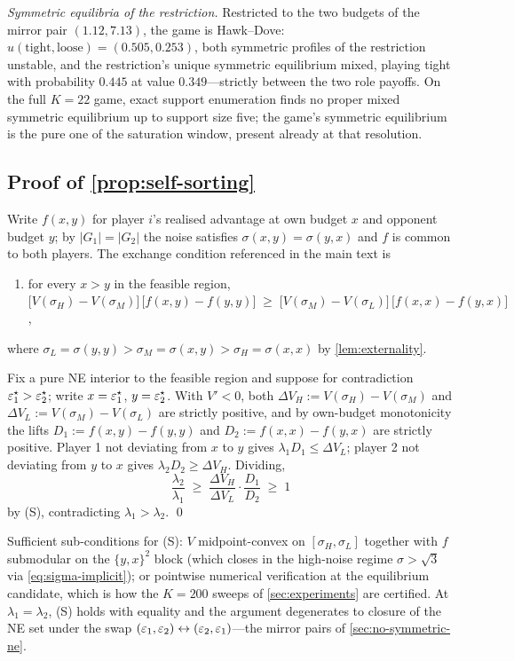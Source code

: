 \emph{Symmetric equilibria of the restriction.} Restricted to the
two budgets of the mirror pair $(1.12, 7.13)$, the game is
Hawk--Dove: $u(\textrm{tight}, \textrm{loose}) = (0.505, 0.253)$,
both symmetric profiles of the restriction unstable, and the
restriction's unique symmetric equilibrium mixed, playing tight
with probability $0.445$ at value $0.349$---strictly between the
two role payoffs. On the full $K = 22$ game, exact support
enumeration finds no proper mixed symmetric equilibrium up to
support size five; the game's symmetric equilibrium is the pure one
of the saturation window, present already at that resolution.

\subsection{Proof of \texorpdfstring{\cref{prop:self-sorting}}{the self-sorting proposition}}
\label{app:proof-self-sorting}

Write $f(x, y)$ for player $i$'s realised advantage at own budget $x$
and opponent budget $y$; by $|G_1| = |G_2|$
the noise satisfies $\sigma(x,y) = \sigma(y,x)$ and $f$ is common to
both players. The exchange condition referenced in the main text is
\begin{enumerate}
  \item[\textup{(S)}] for every $x > y$ in the feasible region,
        $\bigl[V(\sigma_H) - V(\sigma_M)\bigr]\,
         \bigl[f(x, y) - f(y, y)\bigr]
         \;\ge\;
         \bigl[V(\sigma_M) - V(\sigma_L)\bigr]\,
         \bigl[f(x, x) - f(y, x)\bigr]$,
\end{enumerate}
where $\sigma_L = \sigma(y,y) > \sigma_M = \sigma(x,y) > \sigma_H =
\sigma(x,x)$ by \cref{lem:externality}.

Fix a pure \ac{NE} interior to the feasible region and suppose for
contradiction $\varepsilon_1^\star > \varepsilon_2^\star$; write $x = \varepsilon_1^\star$,
$y = \varepsilon_2^\star$. With $V' < 0$, both $\Delta V_H := V(\sigma_H) -
V(\sigma_M)$ and $\Delta V_L := V(\sigma_M) - V(\sigma_L)$ are
strictly positive, and by own-budget monotonicity the lifts $D_1 :=
f(x,y) - f(y,y)$ and $D_2 := f(x,x) - f(y,x)$ are strictly positive.
Player 1 not deviating from $x$ to $y$ gives $\lambda_1 D_1 \le \Delta
V_L$; player 2 not deviating from $y$ to $x$ gives $\lambda_2 D_2 \ge
\Delta V_H$. Dividing,
\[
\frac{\lambda_2}{\lambda_1} \;\ge\; \frac{\Delta V_H}{\Delta V_L}\cdot\frac{D_1}{D_2}
\;\ge\; 1
\]
by (S), contradicting $\lambda_1 > \lambda_2$. \qed

Sufficient sub-conditions for (S): $V$ midpoint-convex on
$[\sigma_H, \sigma_L]$ together with $f$ submodular on the
$\{y,x\}^2$ block (which closes in the high-noise regime $\sigma >
\sqrt 3$ via \eqref{eq:sigma-implicit}); or pointwise numerical
verification at the equilibrium candidate, which is how the
$K = 200$ sweeps of \cref{sec:experiments} are certified. At $\lambda_1 =
\lambda_2$, (S) holds with equality and the argument degenerates to
closure of the \ac{NE} set under the swap $(\varepsilon_1,\varepsilon_2)
\leftrightarrow (\varepsilon_2,\varepsilon_1)$---the mirror pairs of
\cref{sec:no-symmetric-ne}.

